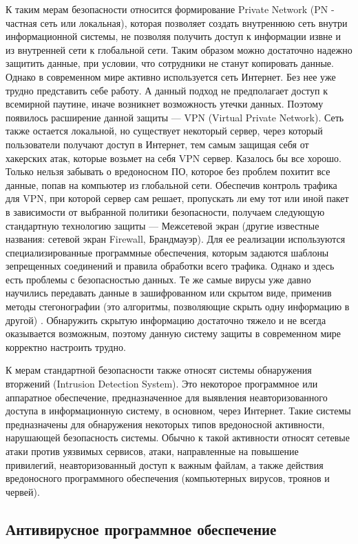 К таким мерам безопасности относится формирование Private Network (PN - частная сеть или локальная), которая позволяет создать внутреннюю сеть внутри информационной системы, не позволяя получить доступ к информации извне и из внутренней сети к глобальной сети. Таким образом можно достаточно надежно защитить данные, при условии, что сотрудники не станут копировать данные. Однако в современном мире активно используется сеть Интернет. Без нее уже трудно представить себе работу. А данный подход не предполагает доступ к всемирной паутине, иначе возникнет возможность утечки данных. Поэтому появилось расширение данной защиты --- VPN (Virtual Private Network). Сеть также остается локальной, но существует некоторый сервер, через который пользователи получают доступ в Интернет, тем самым защищая себя от хакерских атак, которые возьмет на себя VPN сервер. Казалось бы все хорошо. Только нельзя забывать о вредоносном ПО, которое без проблем похитит все данные, попав на компьютер из глобальной сети. Обеспечив контроль трафика для VPN, при которой сервер сам решает, пропускать ли ему тот или иной пакет в зависимости от выбранной политики безопасности, получаем следующую стандартную технологию защиты --- Межсетевой экран (другие известные названия: сетевой экран Firewall, Брандмауэр). Для ее реализации используются специализированные программные обеспечения, которым задаются шаблоны зепрещенных соединений и правила обработки всего трафика. Однако и здесь есть проблемы с безопасностью данных. Те же самые вирусы уже давно научились передавать данные в зашифрованном или скрытом виде, применив методы стегонографии (это алгоритмы, позволяющие скрыть одну информацию в другой) . Обнаружить скрытую информацию достаточно тяжело и не всегда оказывается возможным, поэтому данную систему защиты в современном мире корректно настроить трудно.

К мерам стандартной безопасности также относят системы обнаружения вторжений (Intrusion Detection System). Это некоторое программное или аппаратное обеспечение, предназначенное для выявления неавторизованного доступа в информационную систему, в основном, через Интернет. Такие системы предназначены для обнаружения некоторых типов вредоносной активности, нарушающей безопасность системы. Обычно к такой активности относят сетевые атаки против уязвимых сервисов, атаки, направленные на повышение привилегий, неавторизованный доступ к важным файлам, а также действия вредоносного программного обеспечения (компьютерных вирусов, троянов и червей).

\subsection{Антивирусное программное обеспечение}

